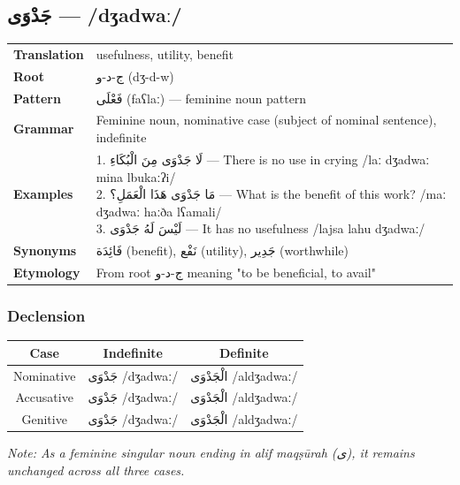 \documentclass[letterpaper,12pt]{article}
\begin{document}
\subsection{\textarabic{جَدْوَى} — /dʒadwaː/}
\begin{tabular}{p{3cm}p{10cm}}
\toprule
\textbf{Translation} & usefulness, utility, benefit \\
\textbf{Root} & \textarabic{ج-د-و} (dʒ-d-w) \\
\textbf{Pattern} & \textarabic{فَعْلَى} (faʕlaː) — feminine noun pattern \\
\textbf{Grammar} & Feminine noun, nominative case (subject of nominal sentence), indefinite \\
\midrule
\textbf{Examples} & \makecell[l]{\parbox{9.5cm}{
1. \textarabic{لَا جَدْوَى مِنَ الْبُكَاءِ} — There is no use in crying /laː dʒadwaː mina lbukaːʔi/\\
2. \textarabic{مَا جَدْوَى هَذَا الْعَمَلِ؟} — What is the benefit of this work? /maː dʒadwaː haːða lʕamali/\\
3. \textarabic{لَيْسَ لَهُ جَدْوَى} — It has no usefulness /lajsa lahu dʒadwaː/
}} \\
\midrule
\textbf{Synonyms} & \textarabic{فَائِدَة} (benefit), \textarabic{نَفْع} (utility), \textarabic{جَدِير} (worthwhile) \\
\textbf{Etymology} & From root \textarabic{ج-د-و} meaning "to be beneficial, to avail" \\
\bottomrule
\end{tabular}

\subsubsection*{Declension}
\begin{tabular}{|c|c|c|}
\hline
\textbf{Case} & \textbf{Indefinite} & \textbf{Definite} \\
\hline
Nominative & \textarabic{جَدْوَى} /dʒadwaː/ & \textarabic{الْجَدْوَى} /aldʒadwaː/ \\
\hline
Accusative & \textarabic{جَدْوَى} /dʒadwaː/ & \textarabic{الْجَدْوَى} /aldʒadwaː/ \\
\hline
Genitive & \textarabic{جَدْوَى} /dʒadwaː/ & \textarabic{الْجَدْوَى} /aldʒadwaː/ \\
\hline
\end{tabular}
\vspace{0.5em}

\textit{Note: As a feminine singular noun ending in alif maqṣūrah (\textarabic{ى}), it remains unchanged across all three cases.}
\end{document}
